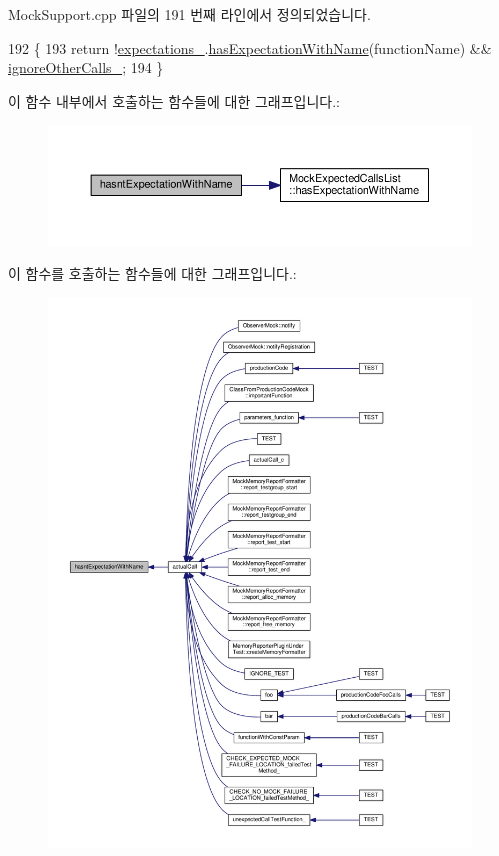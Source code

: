 Mock\+Support.\+cpp 파일의 191 번째 라인에서 정의되었습니다.


\begin{DoxyCode}
192 \{
193     \textcolor{keywordflow}{return} !\hyperlink{class_mock_support_a8f02a0b866ff54bef3fb38cd8bc57fa2}{expectations\_}.\hyperlink{class_mock_expected_calls_list_abc07f8d24b76a0d76aba12c8307bf90f}{hasExpectationWithName}(functionName) && 
      \hyperlink{class_mock_support_a5a3b2bc086fdd2ca5aae69b37ea70942}{ignoreOtherCalls\_};
194 \}
\end{DoxyCode}


이 함수 내부에서 호출하는 함수들에 대한 그래프입니다.\+:
\nopagebreak
\begin{figure}[H]
\begin{center}
\leavevmode
\includegraphics[width=350pt]{class_mock_support_a0ed7769953f8548c078fa38121442cdc_cgraph}
\end{center}
\end{figure}




이 함수를 호출하는 함수들에 대한 그래프입니다.\+:
\nopagebreak
\begin{figure}[H]
\begin{center}
\leavevmode
\includegraphics[width=350pt]{class_mock_support_a0ed7769953f8548c078fa38121442cdc_icgraph}
\end{center}
\end{figure}


